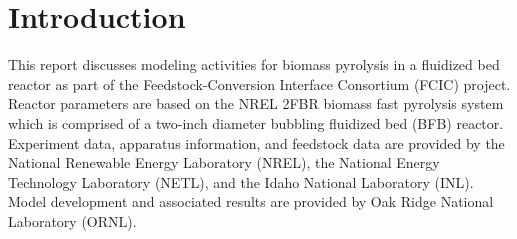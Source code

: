 
\section{Introduction}

This report discusses modeling activities for biomass pyrolysis in a fluidized bed reactor as part of the Feedstock-Conversion Interface Consortium (FCIC) project. Reactor parameters are based on the NREL 2FBR biomass fast pyrolysis system which is comprised of a two-inch diameter bubbling fluidized bed (BFB) reactor. Experiment data, apparatus information, and feedstock data are provided by the National Renewable Energy Laboratory (NREL), the National Energy Technology Laboratory (NETL), and the Idaho National Laboratory (INL). Model development and associated results are provided by Oak Ridge National Laboratory (ORNL).
